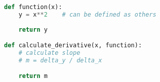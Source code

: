 \documentclass[11pt]{article}
\begin{document}
\begin{lstlisting}[language=Python]
def function(x):
    y = x**2    # can be defined as others
    
    return y

def calculate_derivative(x, function):
    # calculate slope
    # m = delta_y / delta_x

    return m
\end{lstlisting}

\begin{tcolorbox}[colback=black!10!white, colframe=black!75!white, title=\textbf{Answer}]
    \vspace{3cm}
\end{tcolorbox} 
\end{document}
